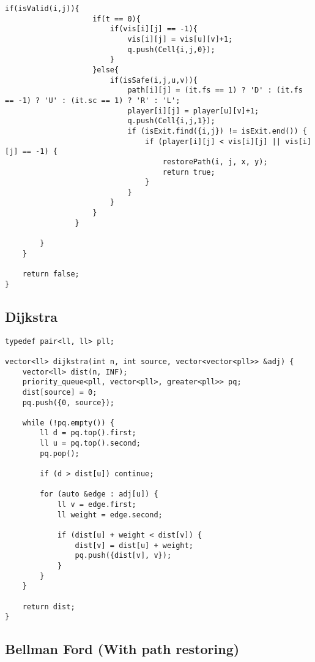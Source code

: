 \documentclass[10pt]{article}
\begin{document}
\begin{multicols*}{2}
\begin{lstlisting}[style=compactcpp]
                if(isValid(i,j)){
                    if(t == 0){
                        if(vis[i][j] == -1){
                            vis[i][j] = vis[u][v]+1;
                            q.push(Cell{i,j,0});
                        }
                    }else{
                        if(isSafe(i,j,u,v)){
                            path[i][j] = (it.fs == 1) ? 'D' : (it.fs == -1) ? 'U' : (it.sc == 1) ? 'R' : 'L';
                            player[i][j] = player[u][v]+1;
                            q.push(Cell{i,j,1});
                            if (isExit.find({i,j}) != isExit.end()) {
                                if (player[i][j] < vis[i][j] || vis[i][j] == -1) {
                                    restorePath(i, j, x, y);
                                    return true;
                                }
                            }
                        }
                    }
                }
    
        }
    }
 
    return false;
}
\end{lstlisting}

\subsection{Dijkstra}

\begin{lstlisting}[style=compactcpp]
typedef pair<ll, ll> pll;
 
vector<ll> dijkstra(int n, int source, vector<vector<pll>> &adj) {
    vector<ll> dist(n, INF);
    priority_queue<pll, vector<pll>, greater<pll>> pq; 
    dist[source] = 0;
    pq.push({0, source}); 

    while (!pq.empty()) {
        ll d = pq.top().first; 
        ll u = pq.top().second; 
        pq.pop();

        if (d > dist[u]) continue;

        for (auto &edge : adj[u]) {
            ll v = edge.first;
            ll weight = edge.second; 

            if (dist[u] + weight < dist[v]) { 
                dist[v] = dist[u] + weight;
                pq.push({dist[v], v}); 
            }
        }
    }

    return dist;
}
\end{lstlisting}

\subsection{Bellman Ford (With path restoring)}


\end{multicols*}
\end{document}
